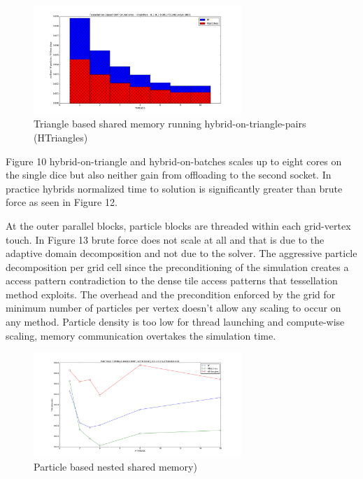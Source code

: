 \documentclass[times,12pt]{article}
\begin{document}
\begin{figure}[htb]
  \begin{center}
    \includegraphics[width=0.7\textwidth]{experiments/omp/bf_vs_hbatches_omp_200.png}
  \end{center}
  \caption{Triangle based shared memory running hybrid-on-triangle-pairs (HTriangles)}
  \label{figure:bfvshbatches_triangle_omp12}
\end{figure}

Figure 10 hybrid-on-triangle and hybrid-on-batches scales up to eight cores on the single dice but also neither gain from offloading to the second socket. In practice hybrids normalized time to solution is significantly greater than brute force as seen in Figure 12.


At the outer parallel blocks, particle blocks are threaded within each grid-vertex touch. In Figure 13 brute force does not scale at all and that is due to the adaptive domain decomposition and not due to the solver. The aggressive particle decomposition per grid cell since the preconditioning of the simulation creates a access pattern contradiction to the dense tile access patterns that tessellation method exploits. The overhead and the precondition enforced by the grid for minimum number of particles per vertex doesn't allow any scaling to occur on any method. Particle density is too low for thread launching and compute-wise scaling, memory communication overtakes the simulation time. 

\begin{figure}[htb]
  \begin{center}
    \includegraphics[width=0.7\textwidth]{experiments/random/omp/particle_triangle_based_x0.png}
  \end{center}
  \caption{Particle based nested shared memory)}
  \label{figure:particletriangle_omp13}
\end{figure}
\end{document}
